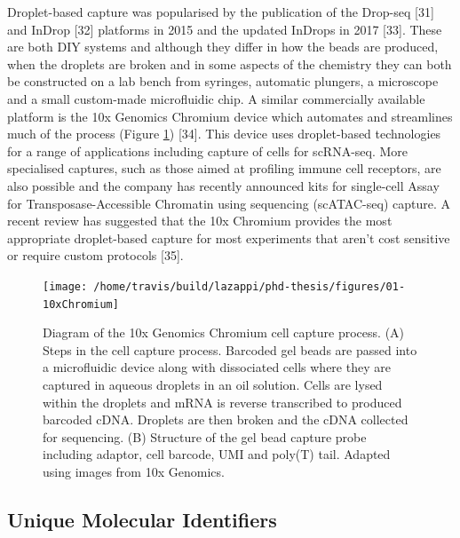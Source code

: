 \documentclass[11pt,a4paper,titlepage,twoside,openright]{style/unimelbthesis}
\theoremstyle{definition}
\theoremstyle{definition}
\theoremstyle{definition}
\theoremstyle{remark}
\begin{document}
\begin{mainmatter}
Droplet-based capture was popularised by the publication of the Drop-seq {[}31{]} and InDrop {[}32{]} platforms in 2015 and the updated InDrops in 2017 {[}33{]}. These are both DIY systems and although they differ in how the beads are produced, when the droplets are broken and in some aspects of the chemistry they can both be constructed on a lab bench from syringes, automatic plungers, a microscope and a small custom-made microfluidic chip. A similar commercially available platform is the 10x Genomics Chromium device which automates and streamlines much of the process (Figure \ref{fig:10xChromium}) {[}34{]}. This device uses droplet-based technologies for a range of applications including capture of cells for scRNA-seq. More specialised captures, such as those aimed at profiling immune cell receptors, are also possible and the company has recently announced kits for single-cell Assay for Transposase-Accessible Chromatin using sequencing (scATAC-seq) capture. A recent review has suggested that the 10x Chromium provides the most appropriate droplet-based capture for most experiments that aren't cost sensitive or require custom protocols {[}35{]}.

\begin{figure}

{\centering \texttt{[image: /home/travis/build/lazappi/phd-thesis/figures/01-10xChromium]} 

}

\caption[Diagram of the 10x Genomics Chromium cell capture process.]{Diagram of the 10x Genomics Chromium cell capture process. (A) Steps in the cell capture process. Barcoded gel beads are passed into a microfluidic device along with dissociated cells where they are captured in aqueous droplets in an oil solution. Cells are lysed within the droplets and mRNA is reverse transcribed to produced barcoded cDNA. Droplets are then broken and the cDNA collected for sequencing. (B) Structure of the gel bead capture probe including adaptor, cell barcode, UMI and poly(T) tail. Adapted using images from 10x Genomics.}\label{fig:10xChromium}
\end{figure}





\hypertarget{unique-molecular-identifiers}{%
\subsection{Unique Molecular Identifiers}\label{unique-molecular-identifiers}}


\end{mainmatter}
\end{document}
